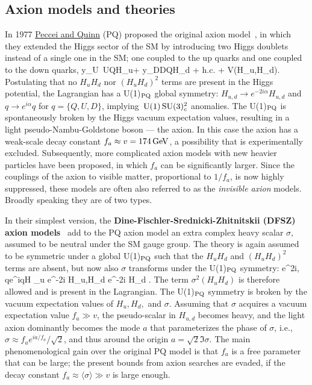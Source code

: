 \subsection{Axion models and theories}\label{AxionModels}
In 1977 \href{https://doi.org/10.1103/PhysRevD.16.1791}{Peccei and Quinn} (PQ) proposed the original axion model~\cite{axionmodels},  in which they extended the Higgs sector of the SM 
by introducing two Higgs doublets instead of a single one in the SM; one coupled to the up quarks and one coupled to the down quarks,
\beq \Lag \supset 
  y_U\,  UQH_u+ y_DDQH_d  +  \hbox{h.c.} + V(H_u,H_d).\eeq
Postulating that no $H_u H_d$ nor $(H_u H_d)^2$ terms are present in the Higgs potential,  the Lagrangian has a
U(1)$_{\rm PQ}$ global symmetry: $H_{u,d}\to e^{-2i\alpha}H_{u,d}$
and $q\to e^{i\alpha }q$ for $q=\{Q,U,D\}$, implying $\,{\rm U}(1)\,{\rm SU}(3)_c^2$ anomalies.
The U(1)$_{\rm PQ}$ is 
spontaneously broken by the Higgs vacuum expectation values, resulting in a light pseudo-Nambu-Goldstone boson --- the axion. In this case the axion has a weak-scale decay constant $f_a \approx v=174\,{\rm GeV}$, a possibility that is experimentally excluded.  
Subsequently, more complicated axion models with new heavier particles have been proposed, in which $f_a$ can be significantly larger. Since the couplings of the axion to visible matter, proportional to $1/f_a$, is now highly suppressed, these models are often also referred to as the {\em invisible axion} models. 
Broadly speaking they are of two types.

\bigskip

In their simplest version, the {\bf Dine-Fischler-Srednicki-Zhitnitskii  (DFSZ) axion models}~\cite{axionmodels} add to the PQ axion model
an extra complex heavy scalar $\sigma$, assumed to be neutral under the SM gauge group.
The theory is again assumed to be symmetric under a global U(1)$_{\rm PQ}$  such that the $H_u H_d$ and $(H_u H_d)^2$ terms are absent, but now also  $\sigma$ transforms under the U(1)$_{\rm PQ}$ symmetry:
\beq  \sigma\to e^{2i\alpha}\sigma,\qquad
q\to e^{i\alpha }q\qquad H _u \to e^{-2i\alpha} H_u,\qquad H_d \to e^{-2i\alpha} H_d .
\eeq
The term
$\sigma^2 (H_u H_d)$ is therefore allowed and is present in the Lagrangian.
The U(1)$_{\rm PQ}$ symmetry is broken by the vacuum expectation values of $H_u,H_d,$ and $\sigma$.
Assuming that $\sigma$ acquires a vacuum expectation value $f_a \gg v$,
the pseudo-scalar in $H_{u,d}$ becomes heavy, and
the light axion dominantly becomes the mode $a$ that parameterizes the phase of  $\sigma$, i.e.,  $\sigma\approx f_a e^{i a/f_a}/\sqrt{2}$, and thus
around the origin $a = \sqrt{2}\Im\sigma$.
The main phenomenological gain over the original PQ model is that $f_a$ is a free parameter that can be large; the present bounds from axion searches are evaded, if the
decay constant $f_a \approx \langle \sigma\rangle\gg v$ is large enough.

